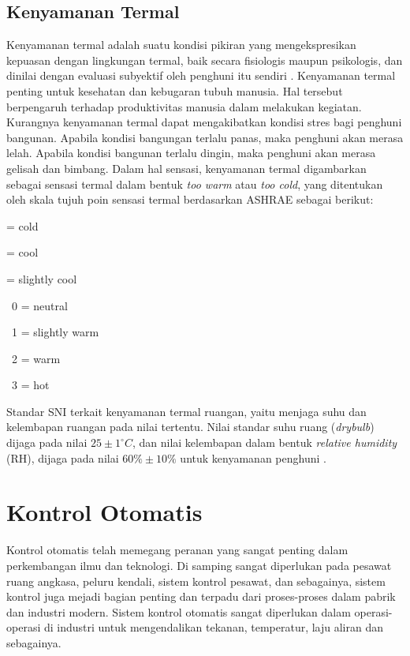\subsection{Kenyamanan Termal}
Kenyamanan termal adalah suatu kondisi pikiran yang mengekspresikan kepuasan dengan lingkungan termal, baik secara fisiologis maupun psikologis, dan dinilai dengan evaluasi subyektif oleh penghuni itu sendiri \cite{ASHRAE55}. Kenyamanan termal penting untuk kesehatan dan kebugaran tubuh manusia. Hal tersebut berpengaruh terhadap produktivitas manusia dalam melakukan kegiatan. Kurangnya kenyamanan termal dapat mengakibatkan kondisi stres bagi penghuni bangunan. Apabila kondisi bangungan terlalu panas, maka penghuni akan merasa lelah. Apabila kondisi bangunan terlalu dingin, maka penghuni akan merasa gelisah dan bimbang. Dalam hal sensasi, kenyamanan termal digambarkan sebagai sensasi termal dalam bentuk \textit{too warm} atau \textit{too cold}, yang ditentukan oleh skala tujuh poin sensasi termal berdasarkan ASHRAE sebagai berikut:

\qquad\qquad\qquad\qquad\qquad{} = cold

\qquad\qquad\qquad\qquad\qquad{} = cool

\qquad\qquad\qquad\qquad\qquad{} = slightly cool

\qquad\qquad\qquad\qquad\qquad\qquad\ 0 = neutral

\qquad\qquad\qquad\qquad\qquad\qquad\ 1 = slightly warm

\qquad\qquad\qquad\qquad\qquad\qquad\ 2 = warm

\qquad\qquad\qquad\qquad\qquad\qquad\ 3 = hot


Standar SNI terkait kenyamanan termal ruangan, yaitu menjaga suhu dan kelembapan ruangan pada nilai tertentu. Nilai standar suhu ruang (\textit{drybulb}) dijaga pada nilai $25\pm 1^{\circ}C$, dan nilai kelembapan dalam bentuk \textit{relative humidity} (RH), dijaga pada nilai $60\% \pm 10\%$ untuk kenyamanan penghuni \cite{SNI-03-06390-2000}.

\section{Kontrol Otomatis}

Kontrol otomatis telah memegang peranan yang sangat penting dalam perkembangan ilmu dan teknologi. Di samping sangat diperlukan pada pesawat ruang angkasa, peluru kendali, sistem kontrol pesawat, dan sebagainya, sistem kontrol juga mejadi bagian penting dan terpadu dari proses-proses dalam pabrik dan industri modern. Sistem kontrol otomatis sangat diperlukan dalam operasi-operasi di industri untuk mengendalikan tekanan, temperatur, laju aliran dan sebagainya.

